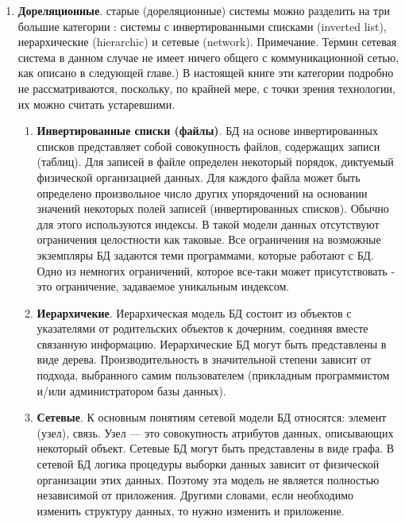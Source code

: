 \begin{enumerate}[label*=\arabic*.]
	\item \textbf{Дореляционные}. 
	старые (дореляционные) 
	системы можно разделить на три большие категории
	: системы с инвертированными списками (inverted list), иерархические (hierarchic) и сетевые (network). Примечание. Термин
		сетевая система в данном случае не имеет ничего общего с коммуникационной сетью, как
		описано в следующей главе.) В настоящей книге эти категории подробно не рассматриваются, поскольку, по крайней мере, с точки зрения технологии, их можно считать устаревшими.
		
	\begin{enumerate}[label*=\arabic*.]
		
		\item \textbf{Инвертированные списки (файлы)}. \newline
		БД на основе инвертированных списков представляет собой совокупность файлов, содержащих записи (таблиц). Для записей в файле определен некоторый порядок, диктуемый физической организацией данных. Для каждого файла может быть определено произвольное число других упорядочений на основании значений некоторых полей записей (инвертированных списков). Обычно для этого используются индексы. В такой модели данных отсутствуют ограничения целостности как таковые. Все ограничения на возможные экземпляры БД задаются теми программами, которые работают с БД. Одно из немногих ограничений, которое все-таки может присутствовать - это ограничение, задаваемое уникальным индексом. 
		
		\item \textbf{Иерархичекие}. \newline
		Иерархическая модель БД состоит из объектов с указателями от родительских объектов к дочерним, соединяя вместе связанную информацию. Иерархические БД могут быть представлены в виде дерева. Производительность в значительной степени зависит от подхода, выбранного самим пользователем (прикладным программистом и/или администратором базы данных).
		
		\item \textbf{Сетевые}. \newline
		К основным понятиям сетевой модели БД относятся: элемент (узел), связь. Узел — это совокупность атрибутов данных, описывающих некоторый объект. Сетевые БД могут быть представлены в виде графа. В сетевой БД логика процедуры выборки данных зависит от физической организации этих данных. Поэтому эта модель не является полностью независимой от приложения. Другими словами, если необходимо изменить структуру данных, то нужно изменить и приложение.
		

\end{enumerate}
\end{enumerate}
